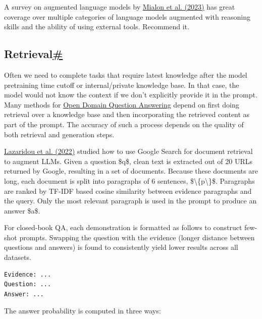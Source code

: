 A survey on augmented language models by \href{https://arxiv.org/abs/2302.07842}{Mialon et al. (2023)} has great coverage over multiple categories of language models augmented with reasoning skills and the ability of using external tools. Recommend it.

\subsection{\texorpdfstring{Retrieval\hyperref[retrieval]{\#}}{Retrieval\#}}\label{retrieval}

Often we need to complete tasks that require latest knowledge after the model pretraining time cutoff or internal/private knowledge base. In that case, the model would not know the context if we don't explicitly provide it in the prompt. Many methods for \href{https://lilianweng.github.io/posts/2020-10-29-odqa/}{Open Domain Question Answering} depend on first doing retrieval over a knowledge base and then incorporating the retrieved content as part of the prompt. The accuracy of such a process depends on the quality of both retrieval and generation steps.

\href{https://arxiv.org/abs/2203.05115}{Lazaridou et al. (2022)} studied how to use Google Search for document retrieval to augment LLMs. Given a question \$q\$, clean text is extracted out of 20 URLs returned by Google, resulting in a set of documents. Because these documents are long, each document is split into paragraphs of 6 sentences, \$\textbackslash\{p\textbackslash\}\$. Paragraphs are ranked by TF-IDF based cosine similarity between evidence paragraphs and the query. Only the most relevant paragraph is used in the prompt to produce an answer \$a\$.

For closed-book QA, each demonstration is formatted as follows to construct few-shot prompts. Swapping the question with the evidence (longer distance between questions and answers) is found to consistently yield lower results across all datasets.

\begin{verbatim}
Evidence: ...
Question: ...
Answer: ...
\end{verbatim}

The answer probability is computed in three ways:

